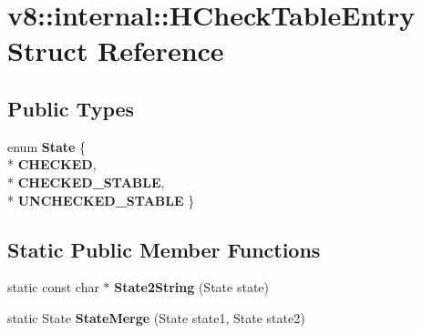 \hypertarget{structv8_1_1internal_1_1_h_check_table_entry}{}\section{v8\+:\+:internal\+:\+:H\+Check\+Table\+Entry Struct Reference}
\label{structv8_1_1internal_1_1_h_check_table_entry}
\subsection*{Public Types}
\begin{DoxyCompactItemize}
\item 
enum {\bfseries State} \{ \\*
{\bfseries C\+H\+E\+C\+K\+ED}, 
\\*
{\bfseries C\+H\+E\+C\+K\+E\+D\+\_\+\+S\+T\+A\+B\+LE}, 
\\*
{\bfseries U\+N\+C\+H\+E\+C\+K\+E\+D\+\_\+\+S\+T\+A\+B\+LE}
 \}\hypertarget{structv8_1_1internal_1_1_h_check_table_entry_a851b29f058c185cb8340eaf3376cf3f3}{}\label{structv8_1_1internal_1_1_h_check_table_entry_a851b29f058c185cb8340eaf3376cf3f3}

\end{DoxyCompactItemize}
\subsection*{Static Public Member Functions}
\begin{DoxyCompactItemize}
\item 
static const char $\ast$ {\bfseries State2\+String} (State state)\hypertarget{structv8_1_1internal_1_1_h_check_table_entry_a89c4964ddaa0108b4f2cfb754080ee3b}{}\label{structv8_1_1internal_1_1_h_check_table_entry_a89c4964ddaa0108b4f2cfb754080ee3b}

\item 
static State {\bfseries State\+Merge} (State state1, State state2)\hypertarget{structv8_1_1internal_1_1_h_check_table_entry_aaaf037993cad2562f642e534145947b9}{}\label{structv8_1_1internal_1_1_h_check_table_entry_aaaf037993cad2562f642e534145947b9}

\end{DoxyCompactItemize}
